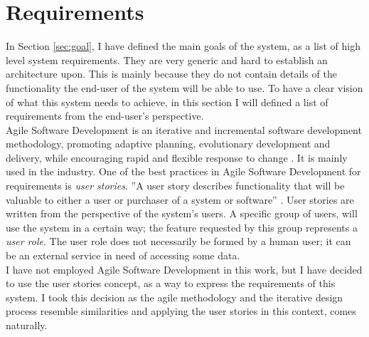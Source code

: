 \section{Requirements} %
\label{sec:requirements}
In Section \ref{sec:goal}, I have defined the main goals of the system, as a list of high level system requirements. They are very generic and hard to establish an architecture upon. This is mainly because they do not contain details of the functionality the end-user of the system will be able to use. To have a clear vision of what this system needs to achieve, in this section I will defined a list of requirements from the end-user's perspective.\\

Agile Software Development is an iterative and incremental software development methodology, promoting adaptive planning, evolutionary development and delivery, while encouraging rapid and flexible response to change \cite{agile:online}. It is mainly used in the industry. One of the best practices in Agile Software Development for requirements is \emph{user stories}. ''A user story describes functionality that will be valuable to either a user or purchaser of a system or software'' \cite{cohn2004user}. User stories are written from the perspective of the system's users. A specific group of users, will use the system in a certain way; the feature requested by this group represents a \emph{user role}. The user role does not necessarily be formed by a human user; it can be an external service in need of accessing some data.\\

I have not employed Agile Software Development in this work, but I have decided to use the user stories concept, as a way to express the requirements of this system. I took this decision as the agile methodology and the iterative design process resemble similarities and applying the user stories in this context, comes naturally.\\

